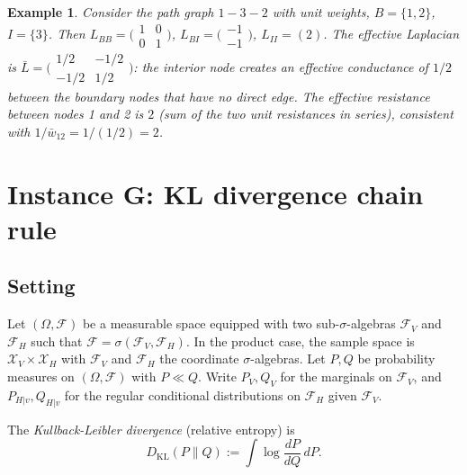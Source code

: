 \documentclass[11pt,a4paper]{article}
\numberwithin{equation}{section}
\theoremstyle{thmcompact}
\newtheorem{example}[theorem]{Example}
\theoremstyle{remark}
\begin{document}
\begin{example}
Consider the path graph $1 - 3 - 2$ with unit weights, $B = \{1, 2\}$, $I = \{3\}$. Then $L_{BB} = \bigl(\begin{smallmatrix} 1 & 0 \\ 0 & 1 \end{smallmatrix}\bigr)$, $L_{BI} = \bigl(\begin{smallmatrix} -1 \\ -1 \end{smallmatrix}\bigr)$, $L_{II} = (2)$. The effective Laplacian is $\bar{L} = \bigl(\begin{smallmatrix} 1/2 & -1/2 \\ -1/2 & 1/2 \end{smallmatrix}\bigr)$: the interior node creates an effective conductance of $1/2$ between the boundary nodes that have no direct edge. The effective resistance between nodes 1 and 2 is $2$ (sum of the two unit resistances in series), consistent with $1/\bar{w}_{12} = 1/(1/2) = 2$.
\end{example}

\section{Instance G: KL divergence chain rule}
\label{sec:bridge-G}

\subsection{Setting}

Let $(\Omega, \mathcal{F})$ be a measurable space equipped with two sub-$\sigma$-algebras $\mathcal{F}_V$ and $\mathcal{F}_H$ such that $\mathcal{F} = \sigma(\mathcal{F}_V, \mathcal{F}_H)$. In the product case, the sample space is $\mathcal{X}_V \times \mathcal{X}_H$ with $\mathcal{F}_V$ and $\mathcal{F}_H$ the coordinate $\sigma$-algebras. Let $P, Q$ be probability measures on $(\Omega, \mathcal{F})$ with $P \ll Q$. Write $P_V, Q_V$ for the marginals on $\mathcal{F}_V$, and $P_{H|v}, Q_{H|v}$ for the regular conditional distributions on $\mathcal{F}_H$ given $\mathcal{F}_V$.

The \emph{Kullback-Leibler divergence} (relative entropy) is
\begin{equation}\label{eq:G-kl}
D_{\mathrm{KL}}(P \| Q) := \int \log \frac{dP}{dQ}\, dP.
\end{equation}
\end{document}
